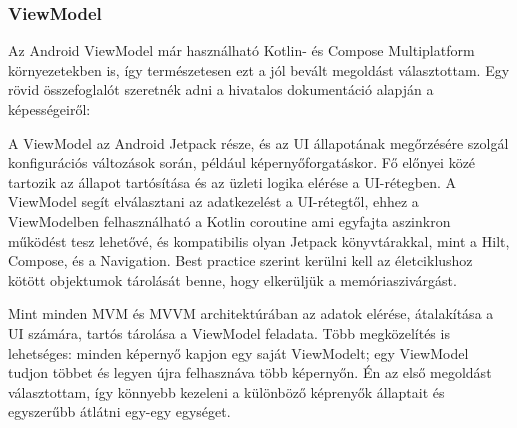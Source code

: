 \subsubsection{ViewModel}
Az Android ViewModel már használható Kotlin- és Compose Multiplatform környezetekben is\cite{ViewModelKMP}, így természetesen ezt a jól bevált megoldást választottam.
Egy rövid összefoglalót szeretnék adni a hivatalos dokumentáció alapján a képességeiről:\cite{ViewModelAndroid}

A ViewModel az Android Jetpack része, és az UI állapotának megőrzésére szolgál konfigurációs változások során, például képernyőforgatáskor.  Fő előnyei közé tartozik az állapot tartósítása és az üzleti logika elérése a UI-rétegben. A ViewModel segít elválasztani az adatkezelést a UI-rétegtől, ehhez a ViewModelben felhasználható a Kotlin coroutine ami egyfajta aszinkron működést tesz lehetővé, és kompatibilis olyan Jetpack könyvtárakkal, mint a Hilt, Compose, és a Navigation. Best practice szerint kerülni kell az életciklushoz kötött objektumok tárolását benne, hogy elkerüljük a memóriaszivárgást. 

Mint minden MVM és MVVM architektúrában az adatok elérése, átalakítása a UI számára, tartós tárolása a ViewModel feladata.
Több megközelítés is lehetséges: minden képernyő kapjon egy saját ViewModelt; egy ViewModel tudjon többet és legyen újra felhasznáva több képernyőn.
Én az első megoldást választottam, így könnyebb kezeleni a különböző képrenyők állaptait és egyszerűbb átlátni egy-egy egységet.

